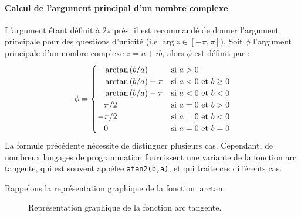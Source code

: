 \paragraph{Calcul de l'argument principal d'un nombre complexe}
L'argument étant définit à $2\pi$ près, il est recommandé de donner 
l'argument principale pour des questions d'unicité 
(i.e $\arg{z}\in[-\pi,\pi]$). 
Soit $\phi$ l'argument principale d'un nombre complexe $z=a+ib$, alors 
$\phi$ est définit par :
$$
\phi=
\begin{cases}
    \hphantom{-}\arctan{(b/a)}     & \text{si $a>0$} \\
    \hphantom{-}\arctan{(b/a)}+\pi & \text{si $a<0$ et $b\ge0$} \\
    \hphantom{-}\arctan{(b/a)}-\pi & \text{si $a<0$ et $b<0$} \\
    \hphantom{-} \pi/2             & \text{si $a=0$ et $b>0$} \\
                -\pi/2             & \text{si $a=0$ et $b<0$} \\
    \hphantom{-}0                  & \text{si $a=0$ et $b=0$} \\
\end{cases}
$$
La formule précédente nécessite de distinguer plusieurs cas.
Cependant, de nombreux langages de programmation fournissent
une variante de la fonction arc tangente, qui est souvent appélee
\verb?atan2(b,a)?, et qui traite ces différents cas. 

Rappelons la représentation graphique de la fonction $\arctan$:

\begin{figure}[!ht]
    \centering
{}
    \caption{Représentation graphique de la fonction arc tangente.
             \label{fig-arctangente}}
\end{figure}


